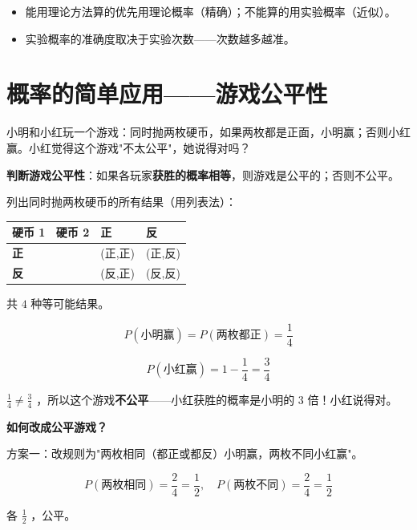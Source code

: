 \begin{keytakeaway}


\begin{itemize}
  \item 能用理论方法算的优先用理论概率（精确）；不能算的用实验概率（近似）。
  \item 实验概率的准确度取决于实验次数——次数越多越准。
\end{itemize}


\end{keytakeaway}



\section*{概率的简单应用——游戏公平性}


\begin{explore}


小明和小红玩一个游戏：同时抛两枚硬币，如果两枚都是正面，小明赢；否则小红赢。小红觉得这个游戏"不太公平"，她说得对吗？

\end{explore}

\begin{understand}


\textbf{判断游戏公平性}：如果各玩家\textbf{获胜的概率相等}，则游戏是公平的；否则不公平。

列出同时抛两枚硬币的所有结果（用列表法）：

\begin{center}
\begin{tabular}{lll}
\toprule
硬币 1 \ 硬币 2 & 正 & 反 \\
\midrule
\textbf{正} & (正,正) & (正,反) \\
\textbf{反} & (反,正) & (反,反) \\
\bottomrule
\end{tabular}
\end{center}


共 $4$ 种等可能结果。

\[
P(\text{小明赢}) = P(\text{两枚都正}) = \frac{1}{4}
\]


\[
P(\text{小红赢}) = 1 - \frac{1}{4} = \frac{3}{4}
\]


$\frac{1}{4} \neq \frac{3}{4}$ ，所以这个游戏\textbf{不公平}——小红获胜的概率是小明的 $3$ 倍！小红说得对。

\textbf{如何改成公平游戏？}

方案一：改规则为"两枚相同（都正或都反）小明赢，两枚不同小红赢"。

\[
P(\text{两枚相同}) = \frac{2}{4} = \frac{1}{2}, \quad P(\text{两枚不同}) = \frac{2}{4} = \frac{1}{2}
\]


各 $\frac{1}{2}$ ，公平。

\end{understand}

